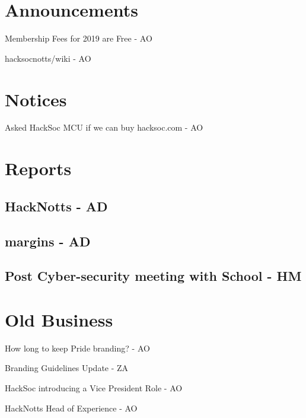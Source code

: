 \documentclass[11pt,agenda]{meetingmins}
\begin{document}
\maketitle

\section{Announcements}
\begin{items}
	\item Membership Fees for 2019 are Free - AO
	\item hacksocnotts/wiki - AO
\end{items}

\section{Notices}
\begin{items}
	\item Asked HackSoc MCU if we can buy hacksoc.com - AO
\end{items}


\section{Reports}

\subsection{HackNotts - AD}
\begin{hiddensubitems}
	\item
\end{hiddensubitems}

\subsection{margins - AD}
\begin{hiddensubitems}
	\item
\end{hiddensubitems}

\subsection{Post Cyber-security meeting with School - HM}
\begin{hiddensubitems}
	\item	
\end{hiddensubitems}


\section{Old Business}
\begin{items}
	\item How long to keep Pride branding? - AO
	\item Branding Guidelines Update - ZA
	\item HackSoc introducing a Vice President Role - AO
	\item HackNotts Head of Experience - AO
\end{items}
\end{document}
